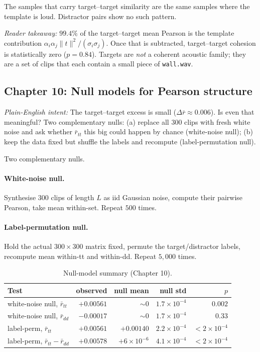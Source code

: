 \documentclass[11pt]{article}
\newcommand{\pintent}[1]{\par\medskip\noindent\textit{Plain-English intent:} #1\par\smallskip}
\newcommand{\pkey}[1]{\par\medskip\noindent\textit{Reader takeaway:} #1\par\smallskip}
\begin{document}
The samples that carry target--target similarity are the same samples
where the template is loud.  Distractor pairs show no such pattern.
\pkey{$99.4\%$ of the target--target mean Pearson is the template
contribution $\alpha_i\alpha_j\|t\|^2/(\sigma_i\sigma_j)$. Once that is
subtracted, target--target cohesion is statistically zero ($p=0.84$). Targets
are \emph{not} a coherent acoustic family; they are a set of clips that each
contain a small piece of \texttt{wall.wav}.}

\subsection{Chapter 10: Null models for Pearson structure}
\pintent{The target--target excess is small ($\Delta\bar r \approx 0.006$).
Is even that meaningful? Two complementary nulls: (a) replace all $300$ clips
with fresh white noise and ask whether $\bar r_{tt}$ this big could happen by
chance (white-noise null); (b) keep the data fixed but shuffle the labels and
recompute (label-permutation null).}

Two complementary nulls.

\paragraph{White-noise null.}
Synthesise $300$ clips of length $L$ as iid Gaussian noise, compute
their pairwise Pearson, take mean within-set.  Repeat $500$ times.
\paragraph{Label-permutation null.}
Hold the actual $300{\times}300$ matrix fixed, permute the
target/distractor labels, recompute mean within-tt and within-dd.
Repeat $5{,}000$ times.

\begin{table}[H]
\centering
\caption{Null-model summary (Chapter 10).}
\begin{tabular}{lrrrr}
\toprule
Test & observed & null mean & null std & $p$ \\
\midrule
white-noise null, $\bar r_{tt}$    & $+0.00561$ & $\sim 0$        & $1.7\!\times\!10^{-4}$ & $0.002$ \\
white-noise null, $\bar r_{dd}$    & $-0.00017$ & $\sim 0$        & $1.7\!\times\!10^{-4}$ & $0.33$ \\
label-perm, $\bar r_{tt}$           & $+0.00561$ & $+0.00140$      & $2.2\!\times\!10^{-4}$ & $<2\!\times\!10^{-4}$ \\
label-perm, $\bar r_{tt}-\bar r_{dd}$ & $+0.00578$ & $+6\!\times\!10^{-6}$ & $4.1\!\times\!10^{-4}$ & $<2\!\times\!10^{-4}$ \\
\bottomrule
\end{tabular}
\end{table}
\end{document}

